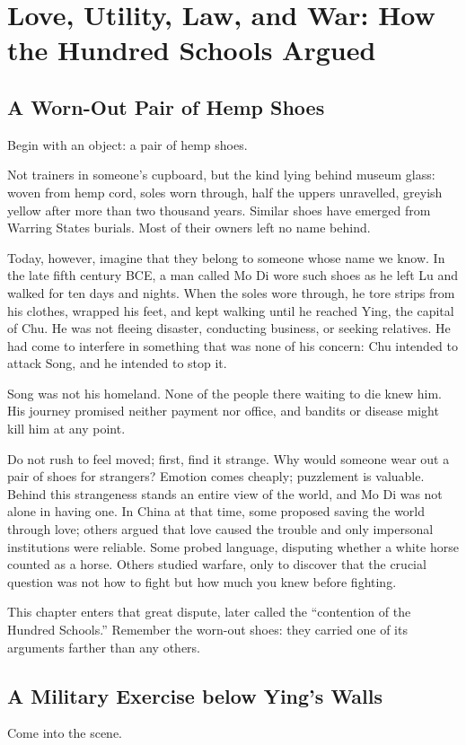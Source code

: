 \chapter[Love, Utility, Law, and War]{Love, Utility, Law, and War: How the Hundred Schools Argued}
\section{A Worn-Out Pair of Hemp Shoes}
Begin with an object: a pair of hemp shoes.

Not trainers in someone's cupboard, but the kind lying behind museum glass: woven from hemp cord, soles worn through, half the uppers unravelled, greyish yellow after more than two thousand years. Similar shoes have emerged from Warring States burials. Most of their owners left no name behind.

Today, however, imagine that they belong to someone whose name we know. In the late fifth century BCE, a man called Mo Di wore such shoes as he left Lu and walked for ten days and nights. When the soles wore through, he tore strips from his clothes, wrapped his feet, and kept walking until he reached Ying, the capital of Chu. He was not fleeing disaster, conducting business, or seeking relatives. He had come to interfere in something that was none of his concern: Chu intended to attack Song, and he intended to stop it.

Song was not his homeland. None of the people there waiting to die knew him. His journey promised neither payment nor office, and bandits or disease might kill him at any point.

Do not rush to feel moved; first, find it strange. Why would someone wear out a pair of shoes for strangers? Emotion comes cheaply; puzzlement is valuable. Behind this strangeness stands an entire view of the world, and Mo Di was not alone in having one. In China at that time, some proposed saving the world through love; others argued that love caused the trouble and only impersonal institutions were reliable. Some probed language, disputing whether a white horse counted as a horse. Others studied warfare, only to discover that the crucial question was not how to fight but how much you knew before fighting.

This chapter enters that great dispute, later called the ``contention of the Hundred Schools.'' Remember the worn-out shoes: they carried one of its arguments farther than any others.

\section{A Military Exercise below Ying's Walls}
Come into the scene.

